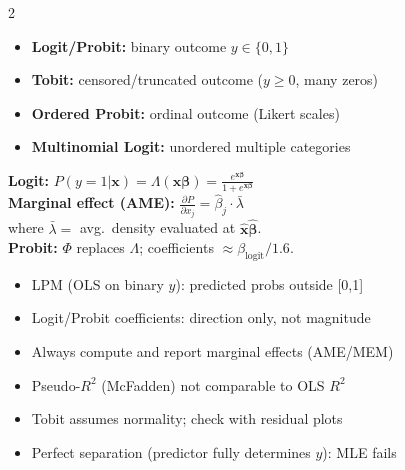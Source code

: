 \documentclass[10pt,a4paper]{article}
\begin{document}
\begin{multicols}{2}

\begin{tcolorbox}[when]
\begin{itemize}
  \item \textbf{Logit/Probit:} binary outcome $y \in \{0,1\}$
  \item \textbf{Tobit:} censored/truncated outcome ($y \geq 0$, many zeros)
  \item \textbf{Ordered Probit:} ordinal outcome (Likert scales)
  \item \textbf{Multinomial Logit:} unordered multiple categories
\end{itemize}
\end{tcolorbox}

\begin{tcolorbox}[key]
\textbf{Logit:} $P(y=1|\mathbf{x}) = \Lambda(\mathbf{x}\boldsymbol\beta) = \frac{e^{\mathbf{x}\boldsymbol\beta}}{1+e^{\mathbf{x}\boldsymbol\beta}}$\\[4pt]
\textbf{Marginal effect (AME):} $\frac{\partial P}{\partial x_j} = \hat\beta_j \cdot \bar{\lambda}$\\
where $\bar\lambda = $ avg.\ density evaluated at $\hat{\mathbf{x}}\hat{\boldsymbol{\beta}}$.\\[4pt]
\textbf{Probit:} $\Phi$ replaces $\Lambda$; coefficients $\approx \beta_{\text{logit}}/1.6$.
\end{tcolorbox}

\columnbreak

\begin{tcolorbox}[watchout]
\begin{itemize}
  \item LPM (OLS on binary $y$): predicted probs outside [0,1]
  \item Logit/Probit coefficients: direction only, not magnitude
  \item Always compute and report marginal effects (AME/MEM)
  \item Pseudo-$R^2$ (McFadden) not comparable to OLS $R^2$
  \item Tobit assumes normality; check with residual plots
  \item Perfect separation (predictor fully determines $y$): MLE fails
\end{itemize}
\end{tcolorbox}

\end{multicols}
\end{document}
